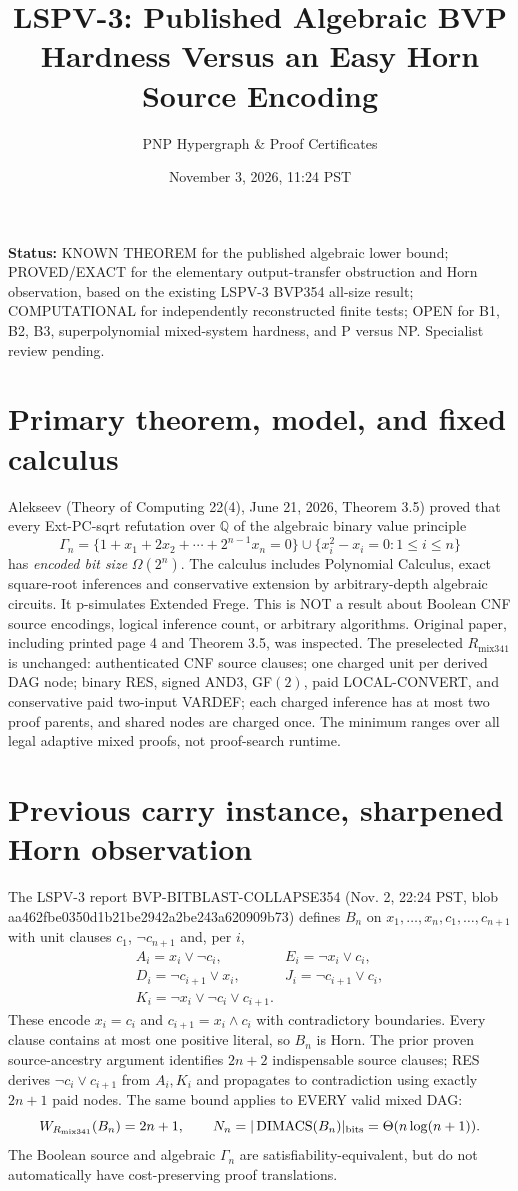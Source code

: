 \documentclass[11pt]{article}
\title{LSPV-3: Published Algebraic BVP Hardness Versus an Easy Horn Source Encoding}
\author{PNP Hypergraph \& Proof Certificates}
\date{November 3, 2026, 11:24 PST}
\begin{document}
\maketitle
\noindent\textbf{Status:} KNOWN THEOREM for the published algebraic lower bound; PROVED/EXACT for the elementary output-transfer obstruction and Horn observation, based on the existing LSPV-3 BVP354 all-size result; COMPUTATIONAL for independently reconstructed finite tests; OPEN for B1, B2, B3, superpolynomial mixed-system hardness, and P versus NP. Specialist review pending.
\section*{Primary theorem, model, and fixed calculus}
Alekseev (Theory of Computing 22(4), June 21, 2026, Theorem 3.5) proved that every Ext-PC-sqrt refutation over $\mathbb Q$ of the algebraic binary value principle
\[
\Gamma_n=\{1+x_1+2x_2+\cdots+2^{n-1}x_n=0\}\cup
\{x_i^2-x_i=0:1\le i\le n\}
\]
has \emph{encoded bit size} $\Omega(2^n)$. The calculus includes Polynomial Calculus, exact square-root inferences and conservative extension by arbitrary-depth algebraic circuits. It p-simulates Extended Frege. This is NOT a result about Boolean CNF source encodings, logical inference count, or arbitrary algorithms. Original paper, including printed page 4 and Theorem 3.5, was inspected.
The preselected $R_{\mathrm{mix341}}$ is unchanged: authenticated CNF source clauses; one charged unit per derived DAG node; binary RES, signed AND3, GF$(2)$, paid LOCAL-CONVERT, and conservative paid two-input VARDEF; each charged inference has at most two proof parents, and shared nodes are charged once. The minimum ranges over all legal adaptive mixed proofs, not proof-search runtime.
\section*{Previous carry instance, sharpened Horn observation}
The LSPV-3 report BVP-BITBLAST-COLLAPSE354 (Nov. 2, 22:24 PST, blob aa462fbe0350d1b21be2942a2be243a620909b73) defines $B_n$ on $x_1,\ldots,x_n,c_1,\ldots,c_{n+1}$ with unit clauses $c_1$, $\neg c_{n+1}$ and, per $i$,
\[
\begin{array}{ll}
A_i=x_i\vee\neg c_i,&E_i=\neg x_i\vee c_i,\\
D_i=\neg c_{i+1}\vee x_i,&J_i=\neg c_{i+1}\vee c_i,\\
K_i=\neg x_i\vee\neg c_i\vee c_{i+1}.
\end{array}
\]
These encode $x_i=c_i$ and $c_{i+1}=x_i\land c_i$ with contradictory boundaries. Every clause contains at most one positive literal, so $B_n$ is Horn. The prior proven source-ancestry argument identifies $2n+2$ indispensable source clauses; RES derives $\neg c_i\vee c_{i+1}$ from $A_i,K_i$ and propagates to contradiction using exactly $2n+1$ paid nodes. The same bound applies to EVERY valid mixed DAG:
\[
W_{R_{\mathrm{mix341}}}(B_n)=2n+1,\qquad
N_n=|\operatorname{DIMACS}(B_n)|_{\rm bits}=\Theta(n\log(n+1)).
\]
The Boolean source and algebraic $\Gamma_n$ are satisfiability-equivalent, but do not automatically have cost-preserving proof translations.
\end{document}
